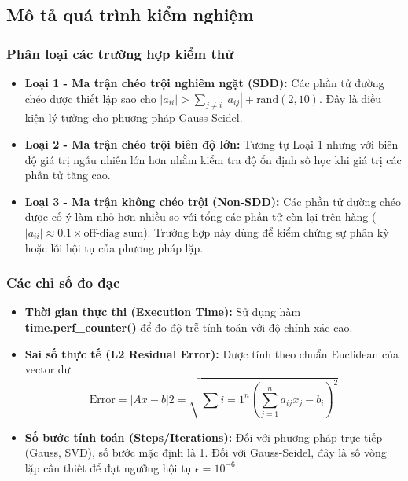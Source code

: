 \documentclass[a4paper]{article}
\begin{document}
\subsection{Mô tả quá trình kiểm nghiệm}
\subsubsection{Phân loại các trường hợp kiểm thử}

\begin{itemize}
\item \textbf{Loại 1 - Ma trận chéo trội nghiêm ngặt (SDD):} Các phần tử đường chéo được thiết lập sao cho $|a_{ii}| > \sum_{j \neq i} |a_{ij}| + \text{rand}(2, 10)$. Đây là điều kiện lý tưởng cho phương pháp Gauss-Seidel.
\item \textbf{Loại 2 - Ma trận chéo trội biên độ lớn:} Tương tự Loại 1 nhưng với biên độ giá trị ngẫu nhiên lớn hơn nhằm kiểm tra độ ổn định số học khi giá trị các phần tử tăng cao.
\item \textbf{Loại 3 - Ma trận không chéo trội (Non-SDD):} Các phần tử đường chéo được cố ý làm nhỏ hơn nhiều so với tổng các phần tử còn lại trên hàng ($|a_{ii}| \approx 0.1 \times \text{off-diag sum}$). Trường hợp này dùng để kiểm chứng sự phân kỳ hoặc lỗi hội tụ của phương pháp lặp.
\end{itemize}

\subsubsection{Các chỉ số đo đạc}

\begin{itemize}
\item \textbf{Thời gian thực thi (Execution Time):} Sử dụng hàm \textbf{time.perf\_counter()} để đo độ trễ tính toán với độ chính xác cao.
\item \textbf{Sai số thực tế (L2 Residual Error):} Được tính theo chuẩn Euclidean của vector dư:
\begin{equation}
\text{Error} = |Ax - b|2 = \sqrt{\sum{i=1}^{n} \left( \sum_{j=1}^{n} a_{ij}x_j - b_i \right)^2}
\end{equation}
\item \textbf{Số bước tính toán (Steps/Iterations):} Đối với phương pháp trực tiếp (Gauss, SVD), số bước mặc định là 1. Đối với Gauss-Seidel, đây là số vòng lặp cần thiết để đạt ngưỡng hội tụ $\epsilon = 10^{-6}$.
\end{itemize}
\end{document}
